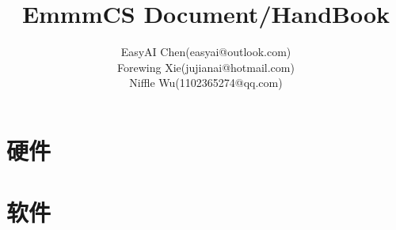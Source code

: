 \documentclass[10pt,fancyhdr,UTF8,twoside,openany]{ctexbook}
\title{EmmmCS Document/HandBook}
\author{
        EasyAI Chen(easyai@outlook.com)\\
        Forewing Xie(jujianai@hotmail.com)\\
        Niffle Wu(1102365274@qq.com)
    }
\begin{document}
\begin{sloppypar}
\maketitle
\tableofcontents
\mainmatter

\part{硬件}






\part{软件}







\end{sloppypar}
\end{document}

